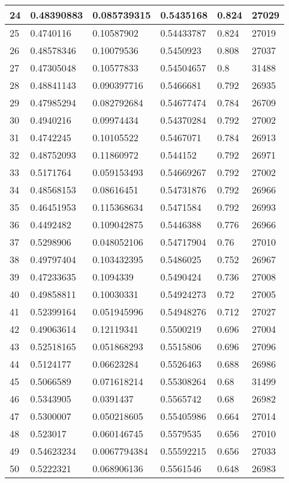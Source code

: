\begin{longtable}{|l|l|l|l|l|l|}
24 & 0.48390883 & 0.085739315 & 0.5435168 & 0.824 & 27029 \\ \hline 
25 & 0.4740116 & 0.10587902 & 0.54433787 & 0.824 & 27019 \\ \hline 
26 & 0.48578346 & 0.10079536 & 0.5450923 & 0.808 & 27037 \\ \hline 
27 & 0.47305048 & 0.10577833 & 0.54504657 & 0.8 & 31488 \\ \hline 
28 & 0.48841143 & 0.090397716 & 0.5466681 & 0.792 & 26935 \\ \hline 
29 & 0.47985294 & 0.082792684 & 0.54677474 & 0.784 & 26709 \\ \hline 
30 & 0.4940216 & 0.09974434 & 0.54370284 & 0.792 & 27002 \\ \hline 
31 & 0.4742245 & 0.10105522 & 0.5467071 & 0.784 & 26913 \\ \hline 
32 & 0.48752093 & 0.11860972 & 0.544152 & 0.792 & 26971 \\ \hline 
33 & 0.5171764 & 0.059153493 & 0.54669267 & 0.792 & 27002 \\ \hline 
34 & 0.48568153 & 0.08616451 & 0.54731876 & 0.792 & 26966 \\ \hline 
35 & 0.46451953 & 0.115368634 & 0.5471584 & 0.792 & 26993 \\ \hline 
36 & 0.4492482 & 0.109042875 & 0.5446388 & 0.776 & 26966 \\ \hline 
37 & 0.5298906 & 0.048052106 & 0.54717904 & 0.76 & 27010 \\ \hline 
38 & 0.49797404 & 0.103432395 & 0.5486025 & 0.752 & 26967 \\ \hline 
39 & 0.47233635 & 0.1094339 & 0.5490424 & 0.736 & 27008 \\ \hline 
40 & 0.49858811 & 0.10030331 & 0.54924273 & 0.72 & 27005 \\ \hline 
41 & 0.52399164 & 0.051945996 & 0.54948276 & 0.712 & 27027 \\ \hline 
42 & 0.49063614 & 0.12119341 & 0.5500219 & 0.696 & 27004 \\ \hline 
43 & 0.52518165 & 0.051868293 & 0.5515806 & 0.696 & 27096 \\ \hline 
44 & 0.5124177 & 0.06623284 & 0.5526463 & 0.688 & 26986 \\ \hline 
45 & 0.5066589 & 0.071618214 & 0.55308264 & 0.68 & 31499 \\ \hline 
46 & 0.5343905 & 0.0391437 & 0.5565742 & 0.68 & 26982 \\ \hline 
47 & 0.5300007 & 0.050218605 & 0.55405986 & 0.664 & 27014 \\ \hline 
48 & 0.523017 & 0.060146745 & 0.5579535 & 0.656 & 27010 \\ \hline 
49 & 0.54623234 & 0.0067794384 & 0.55592215 & 0.656 & 27033 \\ \hline 
50 & 0.5222321 & 0.068906136 & 0.5561546 & 0.648 & 26983 \\ \hline 
\end{longtable}